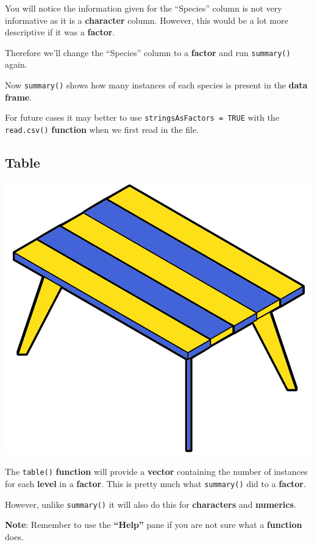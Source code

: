 \documentclass[]{book}
\newenvironment{Shaded}{\begin{snugshade}}{\end{snugshade}}
\newcommand{\KeywordTok}[1]{\textcolor[rgb]{0.13,0.29,0.53}{\textbf{#1}}}
\newcommand{\StringTok}[1]{\textcolor[rgb]{0.31,0.60,0.02}{#1}}
\newcommand{\OperatorTok}[1]{\textcolor[rgb]{0.81,0.36,0.00}{\textbf{#1}}}
\newcommand{\NormalTok}[1]{#1}
\begin{document}
You will notice the information given for the ``Species'' column is not
very informative as it is a \textbf{character} column. However, this
would be a lot more descriptive if it was a \textbf{factor}.

Therefore we'll change the ``Species'' column to a \textbf{factor} and
run \texttt{summary()} again.

\begin{Shaded}
\end{Shaded}

Now \texttt{summary()} shows how many instances of each species is
present in the \textbf{data frame}.

For future cases it may better to use \texttt{stringsAsFactors\ =\ TRUE}
with the \texttt{read.csv()} \textbf{function} when we first read in the
file.

\subsection{Table}\label{table}

\begin{center}\includegraphics[width=0.2\linewidth]{figures/table_ikea} \end{center}

The \texttt{table()} \textbf{function} will provide a \textbf{vector}
containing the number of instances for each \textbf{level} in a
\textbf{factor}. This is pretty much what \texttt{summary()} did to a
\textbf{factor}.

However, unlike \texttt{summary()} it will also do this for
\textbf{characters} and \textbf{numerics}.

\textbf{Note}: Remember to use the \textbf{``Help''} pane if you are not
sure what a \textbf{function} does.
\end{document}
